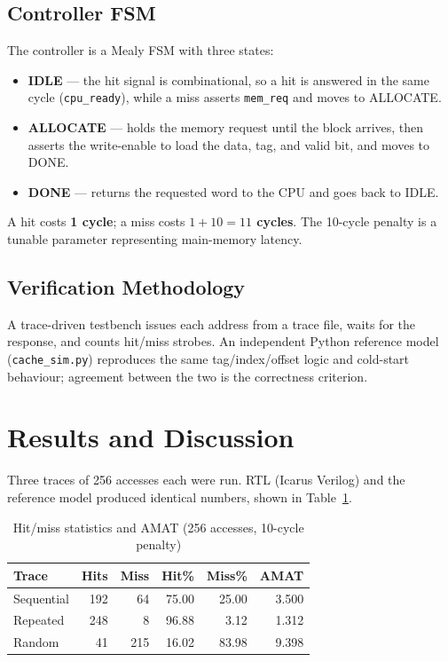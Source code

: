 \documentclass[conference]{IEEEtran}
\begin{document}
\subsection{Controller FSM}
The controller is a Mealy FSM with three states:
\begin{itemize}
  \item \textbf{IDLE} --- the hit signal is combinational, so a hit is answered
        in the same cycle (\texttt{cpu\_ready}), while a miss asserts
        \texttt{mem\_req} and moves to ALLOCATE.
  \item \textbf{ALLOCATE} --- holds the memory request until the block arrives,
        then asserts the write-enable to load the data, tag, and valid bit, and
        moves to DONE.
  \item \textbf{DONE} --- returns the requested word to the CPU and goes back to
        IDLE.
\end{itemize}
A hit costs \textbf{1 cycle}; a miss costs \textbf{$1 + 10 = 11$ cycles}. The
10-cycle penalty is a tunable parameter representing main-memory latency.

\subsection{Verification Methodology}
A trace-driven testbench issues each address from a trace file, waits for the
response, and counts hit/miss strobes. An independent Python reference model
(\texttt{cache\_sim.py}) reproduces the same tag/index/offset logic and
cold-start behaviour; agreement between the two is the correctness criterion.

\section{Results and Discussion}
Three traces of 256 accesses each were run. RTL (Icarus Verilog) and the
reference model produced identical numbers, shown in Table~\ref{tab:results}.

\begin{table}[htbp]
\caption{Hit/miss statistics and AMAT (256 accesses, 10-cycle penalty)}
\label{tab:results}
\centering
\begin{tabular}{@{}lrrrrr@{}}
\toprule
\textbf{Trace} & \textbf{Hits} & \textbf{Miss} & \textbf{Hit\%} & \textbf{Miss\%} & \textbf{AMAT} \\
\midrule
Sequential & 192 & 64  & 75.00 & 25.00 & 3.500 \\
Repeated   & 248 & 8   & 96.88 & 3.12  & 1.312 \\
Random     & 41  & 215 & 16.02 & 83.98 & 9.398 \\
\bottomrule
\end{tabular}
\end{table}
\end{document}
